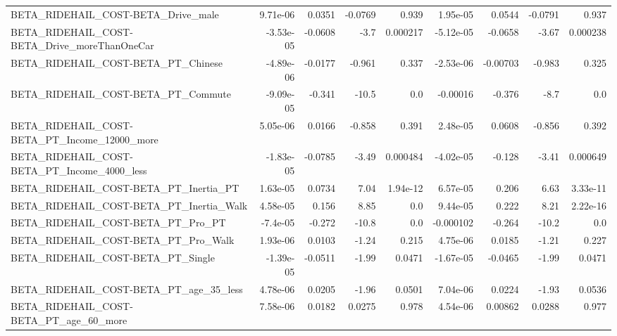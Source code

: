 \begin{tabular}{lrrrrrrrr}
BETA\_RIDEHAIL\_COST-BETA\_Drive\_male                 &    9.71e-06 &       0.0351 &  -0.0769 &    0.939 &   1.95e-05 &      0.0544 &      -0.0791 &         0.937 \\
BETA\_RIDEHAIL\_COST-BETA\_Drive\_moreThanOneCar       &   -3.53e-05 &      -0.0608 &     -3.7 & 0.000217 &  -5.12e-05 &     -0.0658 &        -3.67 &      0.000238 \\
BETA\_RIDEHAIL\_COST-BETA\_PT\_Chinese                 &   -4.89e-06 &      -0.0177 &   -0.961 &    0.337 &  -2.53e-06 &    -0.00703 &       -0.983 &         0.325 \\
BETA\_RIDEHAIL\_COST-BETA\_PT\_Commute                 &   -9.09e-05 &       -0.341 &    -10.5 &      0.0 &   -0.00016 &      -0.376 &         -8.7 &           0.0 \\
BETA\_RIDEHAIL\_COST-BETA\_PT\_Income\_12000\_more       &    5.05e-06 &       0.0166 &   -0.858 &    0.391 &   2.48e-05 &      0.0608 &       -0.856 &         0.392 \\
BETA\_RIDEHAIL\_COST-BETA\_PT\_Income\_4000\_less        &   -1.83e-05 &      -0.0785 &    -3.49 & 0.000484 &  -4.02e-05 &      -0.128 &        -3.41 &      0.000649 \\
BETA\_RIDEHAIL\_COST-BETA\_PT\_Inertia\_PT              &    1.63e-05 &       0.0734 &     7.04 & 1.94e-12 &   6.57e-05 &       0.206 &         6.63 &      3.33e-11 \\
BETA\_RIDEHAIL\_COST-BETA\_PT\_Inertia\_Walk            &    4.58e-05 &        0.156 &     8.85 &      0.0 &   9.44e-05 &       0.222 &         8.21 &      2.22e-16 \\
BETA\_RIDEHAIL\_COST-BETA\_PT\_Pro\_PT                  &    -7.4e-05 &       -0.272 &    -10.8 &      0.0 &  -0.000102 &      -0.264 &        -10.2 &           0.0 \\
BETA\_RIDEHAIL\_COST-BETA\_PT\_Pro\_Walk                &    1.93e-06 &       0.0103 &    -1.24 &    0.215 &   4.75e-06 &      0.0185 &        -1.21 &         0.227 \\
BETA\_RIDEHAIL\_COST-BETA\_PT\_Single                  &   -1.39e-05 &      -0.0511 &    -1.99 &   0.0471 &  -1.67e-05 &     -0.0465 &        -1.99 &        0.0471 \\
BETA\_RIDEHAIL\_COST-BETA\_PT\_age\_35\_less             &    4.78e-06 &       0.0205 &    -1.96 &   0.0501 &   7.04e-06 &      0.0224 &        -1.93 &        0.0536 \\
BETA\_RIDEHAIL\_COST-BETA\_PT\_age\_60\_more             &    7.58e-06 &       0.0182 &   0.0275 &    0.978 &   4.54e-06 &     0.00862 &       0.0288 &         0.977 \\

\end{tabular}

